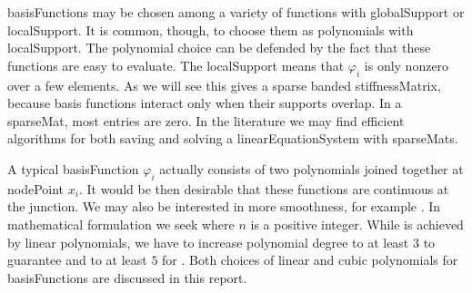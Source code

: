 %
\Gls{basisFunction}s may be chosen among a variety of functions with \gls{globalSupport}
or \gls{localSupport}. It is common, though, to choose them as polynomials with \gls{localSupport}. The polynomial
choice can be defended by the fact that these
functions are easy to evaluate. The \gls{localSupport} means that $\varphi_{i}$ is only nonzero over a few \glspl{element}.
As we will see this gives a sparse banded \gls{stiffnessMatrix}, because basis functions interact only when their supports overlap.
In a \gls{sparseMat}, most entries are zero. In the literature we may find
efficient \glspl{algorithm} for both saving and solving a \gls{linearEquationSystem} with \glspl{sparseMat}.

A typical \gls{basisFunction} $\varphi _{i}$ actually consists of two polynomials joined together at \gls{nodePoint} $x_i$.
It would be then desirable that these functions are continuous at the junction. We may also be interested in more
smoothness, for example . In mathematical formulation we seek  where $n$ is
a positive integer. While  is achieved by linear polynomials, we have to increase polynomial degree to at
least $3$ to guarantee  and to at least $5$ for . Both choices of linear and
cubic polynomials for \glspl{basisFunction} are discussed in this report.
%
